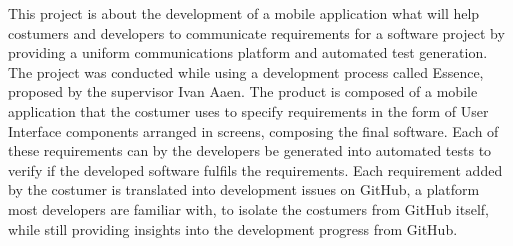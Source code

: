 This project is about the development of a mobile application what will help costumers and developers to communicate requirements for a software project by providing a uniform communications platform and automated test generation.
The project was conducted while using a development process called Essence, proposed by the supervisor Ivan Aaen.
The product is composed of a mobile application that the costumer uses to specify requirements in the form of User Interface components arranged in screens, composing the final software.
Each of these requirements can by the developers be generated into automated tests to verify if the developed software fulfils the requirements.
Each requirement added by the costumer is translated into development issues on GitHub, a platform most developers are familiar with, to isolate the costumers from GitHub itself, while still providing insights into the development progress from GitHub.